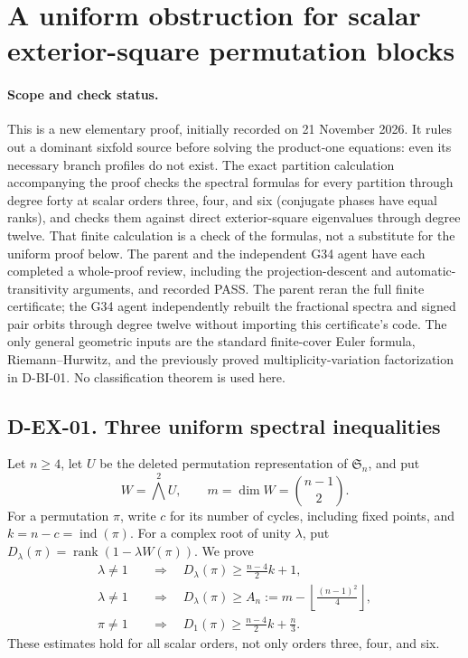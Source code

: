 \section{A uniform obstruction for scalar exterior-square permutation blocks}
\label{sec:exterior-square-obstruction}

\paragraph{Scope and check status.}
This is a new elementary proof, initially recorded on 21 November 2026.
It rules out a dominant sixfold source before solving the product-one
equations: even its necessary branch profiles do not exist.  The exact
partition calculation accompanying the proof checks the spectral formulas
for every partition through degree forty at scalar orders three, four,
and six (conjugate phases have equal ranks), and checks them against direct
exterior-square eigenvalues through degree twelve.  That finite calculation
is a check of the formulas, not a substitute for the uniform proof below.
The parent and the independent G34 agent have each completed a whole-proof
review, including the projection-descent and automatic-transitivity
arguments, and recorded PASS.  The parent reran the full finite certificate;
the G34 agent independently rebuilt the fractional spectra and signed pair
orbits through degree twelve without importing this certificate's code.
The only general geometric inputs are the standard finite-cover Euler
formula, Riemann--Hurwitz, and the previously proved multiplicity-variation
factorization in D-BI-01.  No classification theorem is used here.

\subsection*{D-EX-01. Three uniform spectral inequalities}

Let $n\ge4$, let $U$ be the deleted permutation representation of
$\mathfrak S_n$, and put
\[
        W=\bigwedge^2 U,\qquad m=\dim W=\binom{n-1}{2}.
                                                               \tag{EX.1}
\]
For a permutation $\pi$, write $c$ for its number of cycles, including
fixed points, and $k=n-c=\operatorname{ind}(\pi)$.  For a complex root
of unity $\lambda$, put
$D_\lambda(\pi)=\operatorname{rank}(1-\lambda W(\pi))$.
We prove
\begin{align}
 \lambda\ne1&\quad\Longrightarrow\quad
 D_\lambda(\pi)\ge \frac{n-4}{2}k+1,                  \tag{EX.2}\\
 \lambda\ne1&\quad\Longrightarrow\quad
 D_\lambda(\pi)\ge
 A_n:=m-\left\lfloor\frac{(n-1)^2}{4}\right\rfloor,  \tag{EX.3}\\
 \pi\ne1&\quad\Longrightarrow\quad
 D_1(\pi)\ge\frac{n-4}{2}k+\frac n3.                 \tag{EX.4}
\end{align}
These estimates hold for all scalar orders, not only orders three, four,
and six.

